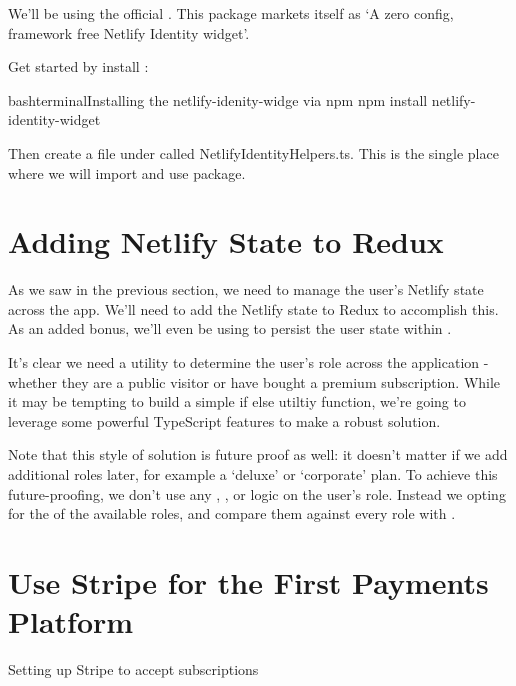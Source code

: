 \documentclass[paper=6in:9in,pagesize=pdftex,headinclude=on,footinclude=on,12pt,twoside]{scrbook}
\begin{document}

We'll be using the official . This package markets itself as `A zero config, framework free Netlify Identity widget'. 


Get started by install :

\begin{codeInput}{bash}{terminal}{Installing the netlify-idenity-widge via npm}
npm install netlify-identity-widget
\end{codeInput}

Then create a file under  called NetlifyIdentityHelpers.ts. This is the single place where we will import and use  package.

\section{Adding Netlify State to Redux}

As we saw in the previous section, we need to manage the user's Netlify state across the app. We'll need to add the Netlify state to Redux to accomplish this. As an added bonus, we'll even be using  to persist the user state within .


It's clear we need a utility to determine the user's role across the application - whether they are a public visitor or have bought a premium subscription. While it may be tempting to build a simple if else utiltiy function, we're going to leverage some powerful TypeScript features to make a robust solution.

Note that this style of solution is future proof as well: it doesn't matter if we add additional roles later, for example a `deluxe' or `corporate' plan. To achieve this future-proofing, we don't use any , , or  logic on the user's role. Instead we opting for the  of the available roles, and compare them against every role with .

\section{Use Stripe for the First Payments Platform}
\begin{arrows}
\item Setting up Stripe to accept subscriptions
\end{arrows}
\end{document}
